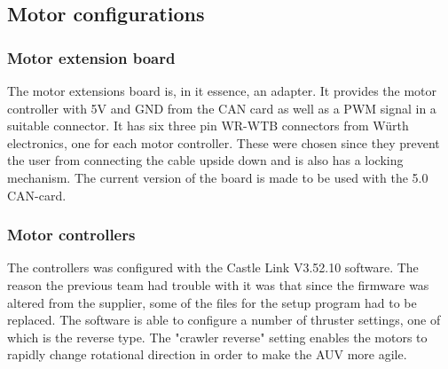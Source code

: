 \subsection{Motor configurations}
\subsubsection{Motor extension board} %
The motor extensions board is, in it essence, an adapter. It provides the motor controller with 5V and GND from the CAN card as well as a PWM signal in a suitable connector. It has six three pin WR-WTB connectors from Würth electronics, one for each motor controller. These were chosen since they prevent the user from connecting the cable upside down and is also has a locking mechanism. The current version of the board is made to be used with the 5.0 CAN-card.

\subsubsection{Motor controllers} %
The controllers was configured with the Castle Link V3.52.10 software. The reason the previous team had trouble with it was that since the firmware was altered from the supplier, some of the files for the setup program had to be replaced. The software is able to configure a number of thruster settings, one of which is the reverse type. The "crawler reverse" setting enables the motors to rapidly change rotational direction in order to make the AUV more agile.